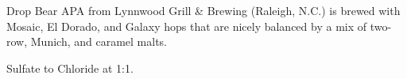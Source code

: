\documentclass[10pt,oneside]{scrbook}
\begin{document}
\begin{aboutblock}
Drop Bear APA from Lynnwood Grill \& Brewing (Raleigh, N.C.) is brewed with Mosaic,
El Dorado, and Galaxy hops that are nicely balanced by a mix of two-row, Munich,
and caramel malts.
\end{aboutblock}


\begin{methodandtiming}
 
\begin{mashsteps}
\end{mashsteps}

\begin{fermentationsteps}
\end{fermentationsteps}

\begin{directions}
Sulfate to Chloride at 1:1.
\end{directions}

\end{methodandtiming}

\pagebreak

\begin{ingredientsblock}

\begin{malts}
\end{malts}

\begin{hops}
\end{hops}

\begin{yeasts}
\end{yeasts}

\end{ingredientsblock}
\end{document}
